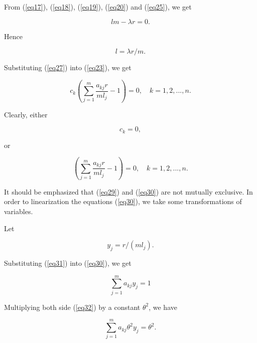 \documentclass [18pt]{article}
\begin{document}
From (\ref{eq17}), (\ref{eq18}), (\ref{eq19}), (\ref{eq20}) and (\ref{eq25}), we get


\begin{equation}
\label{eq26}
lm - \lambda r = 0.
\end{equation}



Hence


\begin{equation}
\label{eq27}
l = \lambda r / m.
\end{equation}



Substituting (\ref{eq27}) into (\ref{eq23}), we get


\begin{equation}
\label{eq28} c_k (\sum\limits_{j = 1}^m {\frac{a_{kj} r}{ml_j }} -
1) = 0, \quad k = 1,2,...,n.
\end{equation}



Clearly, either


\begin{equation}
\label{eq29}
c_k = 0,
\end{equation}



\noindent
or


\begin{equation}
\label{eq30}
(\sum\limits_{j = 1}^m {\frac{a_{kj} r}{ml_j }} - 1) = 0,
\quad
k = 1,2,...,n.
\end{equation}



It should be emphasized that (\ref{eq29}) and (\ref{eq30}) are not mutually exclusive. In
order to linearization the equations (\ref{eq30}), we take some transformations of
variables.

Let


\begin{equation}
\label{eq31}
y_j = r / (ml_j ).
\end{equation}



Substituting (\ref{eq31}) into (\ref{eq30}), we get


\begin{equation}
\label{eq32}
\sum\limits_{j = 1}^m {a_{kj} y_j = 1}
\end{equation}



Multiplying both side (\ref{eq32}) by a constant $\theta ^2$, we have


\begin{equation}
\label{eq33}
\sum\limits_{j = 1}^m {a_{kj} \theta ^2y_j = \theta ^2} .
\end{equation}
\end{document}
